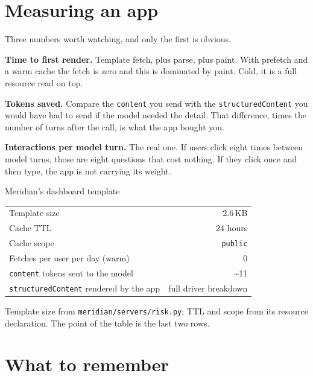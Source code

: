 \section{Measuring an app}

Three numbers worth watching, and only the first is obvious.

\textbf{Time to first render.} Template fetch, plus parse, plus paint. With
prefetch and a warm cache the fetch is zero and this is dominated by paint. Cold,
it is a full resource read on top.

\textbf{Tokens saved.} Compare the \texttt{content} you send with the
\texttt{structuredContent} you would have had to send if the model needed the
detail. That difference, times the number of turns after the call, is what the
app bought you.

\textbf{Interactions per model turn.} The real one. If users click eight times
between model turns, those are eight questions that cost nothing. If they click
once and then type, the app is not carrying its weight.

\begin{measurebox}{Meridian's dashboard template}
\begin{tabular}{@{}lr@{}}
\toprule
Template size                    & 2.6\,KB \\
Cache TTL                        & 24 hours \\
Cache scope                      & \texttt{public} \\
Fetches per user per day (warm)  & 0 \\
\texttt{content} tokens sent to the model & \textasciitilde{}11 \\
\texttt{structuredContent} rendered by the app & full driver breakdown \\
\bottomrule
\end{tabular}

\vspace{6pt}
\footnotesize
Template size from \texttt{meridian/servers/risk.py}; TTL and scope from its
resource declaration. The point of the table is the last two rows.
\end{measurebox}

\section{What to remember}

